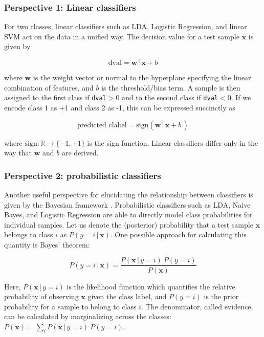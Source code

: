 \documentclass[utf8]{frontiersSCNS} %
\newcommand{\w}{\mathbf{w}}
\newcommand{\x}{\mathbf{x}}
\newcommand{\R}{\mathbb{R}}
\newcommand{\ttt}[1]{\texttt{#1}}
\begin{document}
\subsubsection{Perspective 1: Linear classifiers}

For two classes, linear classifiers such as LDA, Logistic Regression, and linear SVM act on the data in a unified way. The decision value for a test sample $\x$ is given by

\begin{equation}
\label{eq:linear_dval}
\text{dval} = \w^\top\x + b
\end{equation}

where $\w$ is the weight vector or normal to the hyperplane specifying the linear combination of features, and $b$ is the threshold/bias term.  A sample is then  assigned to the first class if \ttt{dval}$>0$ and to the second class if \ttt{dval}$<0$. If we encode class 1 as +1 and class 2 as -1, this can be expressed succinctly as

\begin{equation*}
\text{predicted clabel} =\text{sign} \left(\w^\top\x + b\,\right)
\end{equation*}

where $\text{sign}:\R\rightarrow\{-1,+1\}$ is the sign function. Linear classifiers differ only in the way that $\w$ and $b$ are derived.

\subsubsection{Perspective 2:  probabilistic classifiers}

Another useful perspective for elucidating the relationship between  classifiers is given by the Bayesian framework \citep{Bishop2007}. Probabilistic classifiers such as LDA, Naive Bayes, and Logistic Regression are able to directly model class probabilities for individual samples. Let us denote the (posterior) probability that a test sample $\x$ belongs to class $i$ as $P(y = i\,|\,\x)$. One possible approach for calculating this quantity is Bayes' theorem:

\begin{equation}
\label{eq:bayes}
P(y = i\,|\,\x) = \frac{P(\x\,|\,y = i)\  P(y = i)}{P(\x)}
\end{equation}

Here, $P(\x\,|\,y = i)$ is the likelihood function which quantifies the relative probability of observing $\x$ given the class label, and $P(y = i)$ is the prior probability for a sample to belong to class $i$. The denominator, called evidence, can be calculated by marginalizing across the classes: $P(\x) = \sum_i P(\x\,|\,y = i)\  P(y = i)$.
\end{document}
